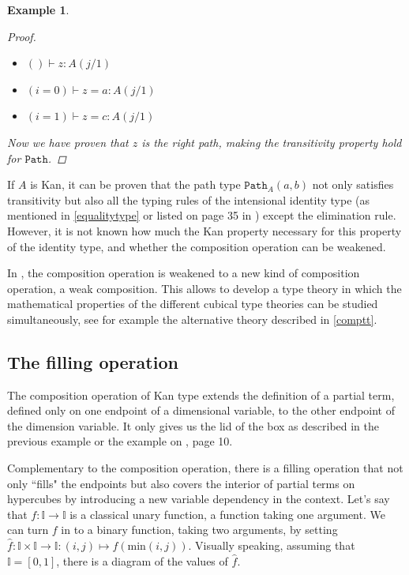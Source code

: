\documentclass[11pt,a4paper,twoside,xetex,draft]{book}
\newtheorem{example}[theorem]{Example}
\newcommand{\op}[1]{\mathtt{#1}}
\begin{document}
\begin{example}
\begin{proof}
\begin{itemize}
\item $ () \vdash z: A(j/1)$
\item $ (i = 0) \vdash z = a : A(j/1)$
\item $ (i = 1) \vdash z = c : A(j/1)$
\end{itemize}

Now we have proven that $z$ is the right path, making the transitivity property hold for $\op{Path}$. 

\end{proof} 

\end{example}

If $A$ is Kan, it can be proven that the path type $\op{Path}_A(a,b)$ not only  satisfies transitivity but also all the typing rules of  the intensional identity type (as mentioned in \cref{equalitytype} or listed on page 35 in \cite{Orton2019}) except the elimination rule. However, it is not known how much the Kan property necessary for this property of the identity type, and whether the composition operation can be weakened. 

In \cite{Cavallo2019}, the composition operation is weakened to a new kind of composition operation, a weak composition. This allows to develop a type theory in which the mathematical properties of the different cubical type theories can be studied simultaneously, see for example the alternative theory described in \cref{comptt}.


\subsection{The filling operation}\label{filling}

The composition operation of Kan type extends the definition of a partial term, defined only on one  endpoint  of a dimensional variable, to the other endpoint of the dimension variable. It only gives us the lid of the box as described in the previous example or the example on \cite{Coquand2018}, page 10. 

Complementary to the composition operation, there is a filling operation that not only ``fills" the endpoints but also covers the interior of partial terms on hypercubes by introducing a new variable dependency in the context. Let's say that $f : \mathbb{I} \rightarrow \mathbb{I}$ is a classical unary function, a function taking one argument. We can turn $f$ in to a binary function, taking two arguments, by setting $\hat{f} : \mathbb{I} \times \mathbb{I} \rightarrow \mathbb{I}: (i,j) \mapsto f(\text{min}(i,j))$. Visually speaking, assuming that $\mathbb{I}=[0,1]$, there is a diagram of the values of $\hat{f}$.
\end{document}
